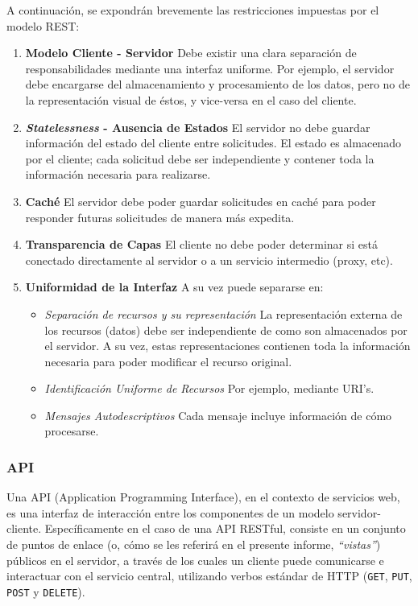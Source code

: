 \documentclass[11pt,letterpaper]{article}
\begin{document}
A continuación, se expondrán brevemente las restricciones impuestas por el modelo REST:
\begin{enumerate}
    \item \textbf{Modelo Cliente - Servidor} \@ Debe existir una clara separación de responsabilidades mediante una interfaz uniforme. Por ejemplo, el servidor debe encargarse del almacenamiento y procesamiento de los datos, pero no de la representación visual de éstos, y vice-versa en el caso del cliente.
    \item \textbf{\textit{Statelessness} - Ausencia de Estados} \@ El servidor no debe guardar información del estado del cliente entre solicitudes. El estado es almacenado por el cliente; cada solicitud debe ser independiente y contener toda la información necesaria para realizarse.
    \item \textbf{Caché} \@ El servidor debe poder guardar solicitudes en caché para poder responder futuras solicitudes de manera más expedita.
    \item \textbf{Transparencia de Capas} \@ El cliente no debe poder determinar si está conectado directamente al servidor o a un servicio intermedio (proxy, etc).
    \item \textbf{Uniformidad de la Interfaz} \@ A su vez puede separarse en:
    \begin{itemize}
        \item \emph{Separación de recursos y su representación} \@ La representación externa de los recursos (datos) debe ser independiente de como son almacenados por el servidor. A su vez, estas representaciones contienen toda la información necesaria para poder modificar el recurso original.
        \item \emph{Identificación Uniforme de Recursos} \@ Por ejemplo, mediante URI's\cite{uri}.
        \item \emph{Mensajes Autodescriptivos} \@ Cada mensaje incluye información de cómo procesarse.
    \end{itemize}
\end{enumerate}

\subsubsection{API}

Una API\cite{api} (Application Programming Interface), en el contexto de servicios web, es una interfaz de interacción entre los componentes de un modelo servidor-cliente. Específicamente en el caso de una API RESTful, consiste en un conjunto de puntos de enlace (o, cómo se les referirá en el presente informe, \emph{``vistas''}) públicos en el servidor, a través de los cuales un cliente puede comunicarse e interactuar con el servicio central, utilizando verbos estándar de HTTP\cite{http} (\texttt{GET}, \texttt{PUT}, \texttt{POST} y \texttt{DELETE}).
\end{document}
